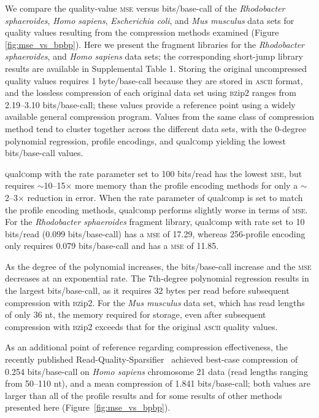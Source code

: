 \documentclass{bioinfo}
\begin{document}
We compare the quality-value \textsc{mse} versus bits/base-call of the
\textit{Rhodobacter sphaeroides}, \textit{Homo sapiens},
\textit{Escherichia coli}, and \textit{Mus musculus} data sets for
quality values resulting from the compression methods examined (Figure
\ref{fig:mse_vs_bpbp}). Here we present the fragment libraries for the
\textit{Rhodobacter sphaeroides}, and \textit{Homo sapiens} data sets;
the corresponding short-jump library results are available in
Supplemental Table 1. Storing the original uncompressed quality values
requires 1 byte/base-call because they are stored in \textsc{ascii}
format, and the lossless compression of each original data set using
\textsc{bz}ip2 ranges from 2.19--3.10 bits/base-call; these values
provide a reference point using a widely available general compression
program. Values from the same class of compression method tend to
cluster together across the different data sets, with the 0-degree
polynomial regression, profile encodings, and
\textsc{q}ual\textsc{c}omp yielding the lowest bits/base-call values.

\textsc{q}ual\textsc{c}omp with the rate parameter set to 100
bits/read has the lowest \textsc{mse}, but requires
$\sim$10--15$\times$ more memory than the profile encoding methods for
only a $\sim$2--3$\times$ reduction in error. When the rate parameter
of \textsc{q}ual\textsc{c}omp is set to match the profile encoding
methods, \textsc{q}ual\textsc{c}omp performs slightly worse in terms
of \textsc{mse}. For the \textit{Rhodobacter sphaeroides} fragment
library, \textsc{q}ual\textsc{c}omp with rate set to 10 bits/read
(0.099 bits/base-call) has a \textsc{mse} of 17.29, whereas
256-profile encoding only requires 0.079 bits/base-call and has a
\textsc{mse} of 11.85.

As the degree of the polynomial increases, the bits/base-call increase
and the \textsc{mse} decreases at an exponential rate. The 7th-degree
polynomial regression results in the largest bits/base-call, as it
requires 32 bytes per read before subsequent compression with
\textsc{bz}ip2. For the \textit{Mus musculus} data set, which has read
lengths of only 36 nt, the memory required for storage, even after
subsequent compression with \textsc{bz}ip2 exceeds that for the
original \textsc{ascii} quality values.

As an additional point of reference regarding compression
effectiveness, the recently published
Read-Quality-Sparsifier~\citep{DBLP:conf/recomb/YuYB14} achieved
best-case compression of 0.254 bits/base-call on \textit{Homo sapiens}
chromosome 21 data (read lengths ranging from 50--110 nt), and a mean
compression of 1.841 bits/base-call; both values are larger than all
of the profile results and for some results of other methods presented
here (Figure~\ref{fig:mse_vs_bpbp}).
\end{document}
